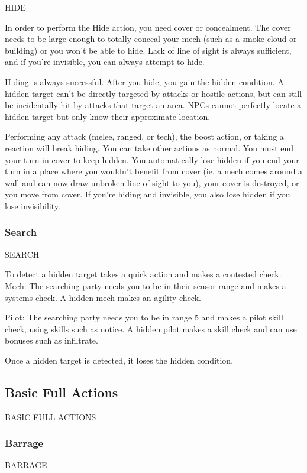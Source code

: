                                                       HIDE

In order to perform the Hide action, you need cover or concealment. The cover needs to be large
enough to totally conceal your mech (such as a smoke cloud or building) or you won’t be able to
hide. Lack of line of sight is always sufficient, and if you’re invisible, you can always attempt to
hide.


Hiding is always successful. After you hide, you gain the hidden condition. A hidden target can’t
be directly targeted by attacks or hostile actions, but can still be incidentally hit by attacks that
target an area. NPCs cannot perfectly locate a hidden target but only know their approximate
location.


Performing any attack (melee, ranged, or tech), the boost action, or taking a reaction will break
hiding. You can take other actions as normal. You must end your turn in cover to keep hidden.
You automatically lose hidden if you end your turn in a place where you wouldn’t benefit from
cover (ie, a mech comes around a wall and can now draw unbroken line of sight to you), your
cover is destroyed, or you move from cover. If you’re hiding and invisible, you also lose hidden if
you lose invisibility.

\subsubsection{Search}
                                                   SEARCH

To detect a hidden target takes a quick action and makes a contested check.
         Mech: The searching party needs you to be in their sensor range and makes a systems
         check. A hidden mech makes an agility check.

         Pilot: The searching party needs you to be in range 5 and makes a pilot skill check, using
         skills such as notice. A hidden pilot makes a skill check and can use bonuses such as
         infiltrate.

Once a hidden target is detected, it loses the hidden condition.

\subsection{Basic Full Actions}BASIC FULL ACTIONS
\subsubsection{Barrage}
                                               BARRAGE

